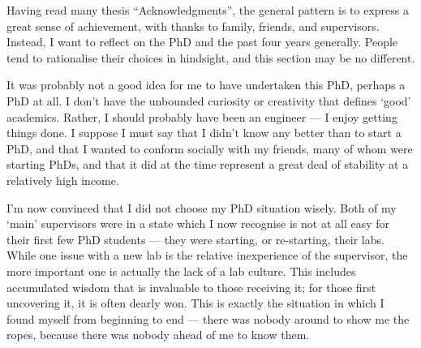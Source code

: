 \label{ch:ack}


\bigskip

\begingroup
\let\clearpage\relax
\let\cleardoublepage\relax
\let\cleardoublepage\relax

Having read many thesis ``Acknowledgments'', the general pattern is to express a great sense of achievement, with thanks to family, friends, and supervisors.
Instead, I want to reflect on the PhD and the past four years generally.
People tend to rationalise their choices in hindsight, and this section may be no different.

It was probably not a good idea for me to have undertaken this PhD, perhaps a PhD at all.
I don't have the unbounded curiosity or creativity that defines `good' academics.
Rather, I should probably have been an engineer --- I enjoy getting things done.
I suppose I must say that I didn't know any better than to start a PhD, and that I wanted to conform socially with my friends, many of whom were starting PhDs, and that it did at the time represent a great deal of stability at a relatively high income.

I'm now convinced that I did not choose my PhD situation wisely.
Both of my `main' supervisors were in a state which I now recognise is not at all easy for their first few PhD students --- they were starting, or re-starting, their labs.
While one issue with a new lab is the relative inexperience of the supervisor, the more important one is actually the lack of a lab culture.
This includes accumulated wisdom that is invaluable to those receiving it; for those first uncovering it, it is often dearly won.
This is exactly the situation in which I found myself from beginning to end --- there was nobody around to show me the ropes, because there was nobody ahead of me to know them.

